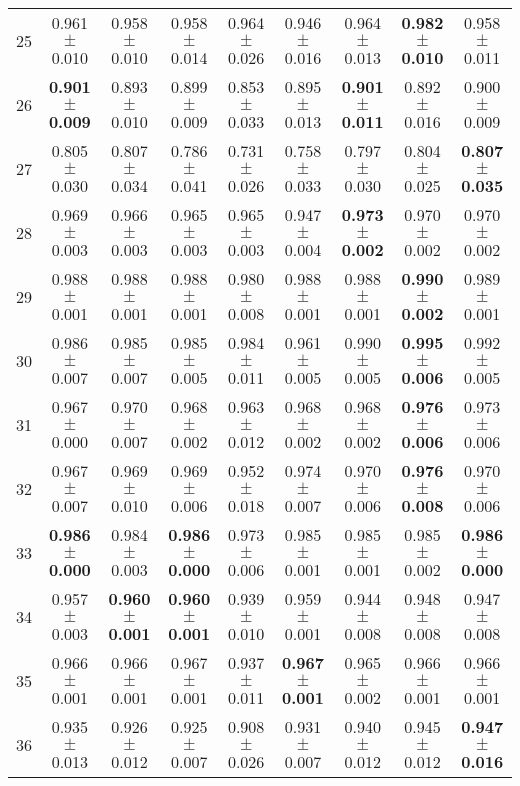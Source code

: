 \begin{table}[!ht]
{\begin{tabular}{r c c c c c c c c}
25 & 0.961 $\pm$ 0.010 & 0.958 $\pm$ 0.010 & 0.958 $\pm$ 0.014 & 0.964 $\pm$ 0.026 & 0.946 $\pm$ 0.016 & 0.964 $\pm$ 0.013 & \textbf{0.982 $\pm$ 0.010} & 0.958 $\pm$ 0.011 \\
26 & \textbf{0.901 $\pm$ 0.009} & 0.893 $\pm$ 0.010 & 0.899 $\pm$ 0.009 & 0.853 $\pm$ 0.033 & 0.895 $\pm$ 0.013 & \textbf{0.901 $\pm$ 0.011} & 0.892 $\pm$ 0.016 & 0.900 $\pm$ 0.009 \\
27 & 0.805 $\pm$ 0.030 & 0.807 $\pm$ 0.034 & 0.786 $\pm$ 0.041 & 0.731 $\pm$ 0.026 & 0.758 $\pm$ 0.033 & 0.797 $\pm$ 0.030 & 0.804 $\pm$ 0.025 & \textbf{0.807 $\pm$ 0.035} \\
28 & 0.969 $\pm$ 0.003 & 0.966 $\pm$ 0.003 & 0.965 $\pm$ 0.003 & 0.965 $\pm$ 0.003 & 0.947 $\pm$ 0.004 & \textbf{0.973 $\pm$ 0.002} & 0.970 $\pm$ 0.002 & 0.970 $\pm$ 0.002 \\
29 & 0.988 $\pm$ 0.001 & 0.988 $\pm$ 0.001 & 0.988 $\pm$ 0.001 & 0.980 $\pm$ 0.008 & 0.988 $\pm$ 0.001 & 0.988 $\pm$ 0.001 & \textbf{0.990 $\pm$ 0.002} & 0.989 $\pm$ 0.001 \\
30 & 0.986 $\pm$ 0.007 & 0.985 $\pm$ 0.007 & 0.985 $\pm$ 0.005 & 0.984 $\pm$ 0.011 & 0.961 $\pm$ 0.005 & 0.990 $\pm$ 0.005 & \textbf{0.995 $\pm$ 0.006} & 0.992 $\pm$ 0.005 \\
31 & 0.967 $\pm$ 0.000 & 0.970 $\pm$ 0.007 & 0.968 $\pm$ 0.002 & 0.963 $\pm$ 0.012 & 0.968 $\pm$ 0.002 & 0.968 $\pm$ 0.002 & \textbf{0.976 $\pm$ 0.006} & 0.973 $\pm$ 0.006 \\
32 & 0.967 $\pm$ 0.007 & 0.969 $\pm$ 0.010 & 0.969 $\pm$ 0.006 & 0.952 $\pm$ 0.018 & 0.974 $\pm$ 0.007 & 0.970 $\pm$ 0.006 & \textbf{0.976 $\pm$ 0.008} & 0.970 $\pm$ 0.006 \\
33 & \textbf{0.986 $\pm$ 0.000} & 0.984 $\pm$ 0.003 & \textbf{0.986 $\pm$ 0.000} & 0.973 $\pm$ 0.006 & 0.985 $\pm$ 0.001 & 0.985 $\pm$ 0.001 & 0.985 $\pm$ 0.002 & \textbf{0.986 $\pm$ 0.000} \\
34 & 0.957 $\pm$ 0.003 & \textbf{0.960 $\pm$ 0.001} & \textbf{0.960 $\pm$ 0.001} & 0.939 $\pm$ 0.010 & 0.959 $\pm$ 0.001 & 0.944 $\pm$ 0.008 & 0.948 $\pm$ 0.008 & 0.947 $\pm$ 0.008 \\
35 & 0.966 $\pm$ 0.001 & 0.966 $\pm$ 0.001 & 0.967 $\pm$ 0.001 & 0.937 $\pm$ 0.011 & \textbf{0.967 $\pm$ 0.001} & 0.965 $\pm$ 0.002 & 0.966 $\pm$ 0.001 & 0.966 $\pm$ 0.001 \\
36 & 0.935 $\pm$ 0.013 & 0.926 $\pm$ 0.012 & 0.925 $\pm$ 0.007 & 0.908 $\pm$ 0.026 & 0.931 $\pm$ 0.007 & 0.940 $\pm$ 0.012 & 0.945 $\pm$ 0.012 & \textbf{0.947 $\pm$ 0.016} \\

\end{tabular}}
\end{table}
